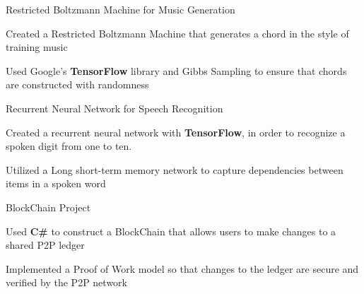 \begin{cventries}
  \cventryy
    {}
    {Restricted Boltzmann Machine for Music Generation}
    {}
    {}
    {
      \begin{cvitems}
        \item {Created a Restricted Boltzmann Machine that generates a chord in the style of training music}
        \item {Used Google's \textbf{TensorFlow} library and Gibbs Sampling to ensure that chords are constructed with randomness}
      \end{cvitems}
    }
  \cventryy
    {}
    {Recurrent Neural Network for Speech Recognition}
    {}
    {}
    {
      \begin{cvitems}
        \item {Created a recurrent neural network with \textbf{TensorFlow}, in order to recognize a spoken digit from one to ten.}
        \item {Utilized a Long short-term memory network to capture dependencies between items in a spoken word}
      \end{cvitems}
    }
  \cventryy
    {}
    {BlockChain Project}
    {}
    {}
    {
      \begin{cvitems}
        \item {Used \textbf{C\#} to construct a BlockChain that allows users to make changes to a shared P2P ledger}
        \item {Implemented a Proof of Work model so that changes to the ledger are secure and verified by the P2P network}
      \end{cvitems}
    }

\end{cventries}
